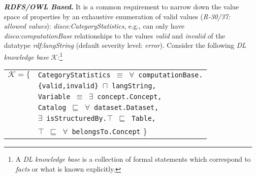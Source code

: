 \documentclass[conference]{IEEEtran}
\newcommand{\ms}[1]{\texttt{#1}}
\newenvironment{DL}{
  \small
  \vspace{0cm}
	\begin{center}
  \begin{tabular}{c l}

}{
  \end{tabular}
	\end{center}
}
\begin{document}
\textbf{\emph{RDFS/OWL Based}.}
It is a common requirement to narrow down the value space of properties by an exhaustive enumeration of valid values (\emph{R-30/37: allowed values}):
\emph{disco:CategoryStatistics}, e.g., can only have \emph{disco:computationBase} relationships to the values \emph{valid} and \emph{invalid} of the datatype \emph{rdf:langString} (default severity level: \emph{error}).
Consider the following \emph{DL knowledge base} $\mathcal{K}$:\footnote{A \emph{DL knowledge base} is a collection of formal statements which correspond to \emph{facts} or what is known explicitly. }
\begin{center}
\begin{DL} 
$\mathcal{K}=\{$ 
&{\small\ms{CategoryStatistics $\equiv$ $\forall$ computationBase.}} \\
	&{\small\ms{\{valid,invalid\} $\sqcap$ langString,}} \\
  &{\small\ms{Variable $\equiv$ $\exists$ concept.Concept,}} \\
	&{\small\ms{Catalog $\sqsubseteq$ $\forall$ dataset.Dataset,}} \\
  &{\small\ms{$\exists$ isStructuredBy.$\top$ $\sqsubseteq$ Table,}} \\
	&{\small\ms{$\top$ $\sqsubseteq$ $\forall$ belongsTo.Concept}}
\}\\ 
\end{DL}
\end{center}
\end{document}
